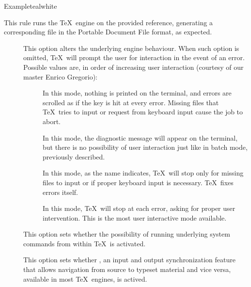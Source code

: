 \begin{description}
\begin{codebox}{Example}{teal}{\icnote}{white}
\end{codebox}

\item[\rulebox{luatex}{Marco Daniel, Paulo Cereda}] This rule runs the  \TeX\ engine on the provided  reference, generating a corresponding file in the Portable Document File format, as expected.

\begin{description}
\item[] This option alters the underlying engine behaviour. When such option is omitted, \TeX\ will prompt the user for interaction in the event of an error. Possible values are, in order of increasing user interaction (courtesy of our master Enrico Gregorio):

\begin{description}
\item[] In this mode, nothing is printed on the terminal, and errors are scrolled as if the  key is hit at every error. Missing files that \TeX\ tries to input or request from keyboard input cause the job to abort.

\item[] In this mode, the diagnostic message will appear on the terminal, but there is no possibility of user interaction just like in batch mode, previously described.

\item[] In this mode, as the name indicates, \TeX\ will stop only for missing files to input or if proper keyboard input is necessary. \TeX\ fixes errors itself.

\item[] In this mode, \TeX\ will stop at each error, asking for proper user intervention. This is the most user interactive mode available.
\end{description}

\item[] This option sets whether the possibility of running underlying system commands from within \TeX\ is activated.

\item[] This option sets whether , an input and output synchronization feature that allows navigation from source to typeset material and vice versa, available in most \TeX\ engines, is actived.


\end{description}
\end{description}
